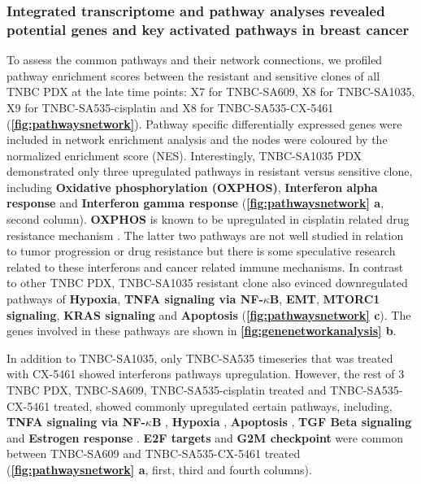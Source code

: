 \subsubsection{Integrated transcriptome and pathway analyses revealed potential genes and key activated pathways in breast cancer}
To assess the common pathways and their network connections, 
we profiled pathway enrichment scores between the resistant and sensitive clones of all TNBC PDX at the late time points:  X7 for TNBC-SA609, X8 for TNBC-SA1035, X9 for TNBC-SA535-cisplatin and X8 for TNBC-SA535-CX-5461 (\textbf{\autoref{fig:pathwaysnetwork}}). 
Pathway specific differentially expressed genes were included in network enrichment analysis and the nodes were coloured by the normalized enrichment score (NES). Interestingly, TNBC-SA1035 PDX demonstrated only three upregulated pathways in resistant versus sensitive clone, including \textbf{Oxidative phosphorylation (OXPHOS)}, \textbf{Interferon alpha response} \cite{provance2019deciphering} and \textbf{Interferon gamma response} \cite{mojic2018dark} (\textbf{\autoref{fig:pathwaysnetwork} a}, second column). \textbf{\ac{OXPHOS}} is known to be upregulated in cisplatin related drug resistance mechanism \cite{lee2017myc}. The latter two pathways are not well studied in relation to tumor progression or drug resistance but there is some speculative research related to these interferons and cancer related immune mechanisms. In contrast to other TNBC PDX, TNBC-SA1035 resistant clone also evinced downregulated pathways of \textbf{Hypoxia}, \textbf{TNFA signaling via NF-$\kappa$B}, \textbf{\ac{EMT}}, \textbf{MTORC1 signaling}, \textbf{KRAS signaling} and \textbf{Apoptosis} ({\textbf{\autoref{fig:pathwaysnetwork} c}}). The genes involved in these pathways are shown in \textbf{\autoref{fig:genenetworkanalysis} b}.

In addition to TNBC-SA1035, only TNBC-SA535 timeseries that was treated with CX-5461 showed interferons pathways upregulation. However, the rest of 3 TNBC PDX, TNBC-SA609, TNBC-SA535-cisplatin treated and TNBC-SA535-CX-5461 treated, showed commonly upregulated certain pathways, including, \textbf{TNFA signaling via NF-$\kappa$B} \cite{lagunas2008nuclear,ito2015down, ryan2019targeting}, \textbf{Hypoxia} \cite{lee2012hypoxia, mcevoy2015identifying, deben2018hypoxia,li2019erk}, \textbf{Apoptosis} \cite{panaretakis2012cisplatin}, \textbf{TGF Beta signaling} \cite{zhang2019tgfbeta1} and \textbf{Estrogen response} \cite{zhu2018er}. \textbf{E2F targets} \cite{zheng2020upregulation} and \textbf{G2M checkpoint} \cite{visconti2016cell} were common between TNBC-SA609 and TNBC-SA535-CX-5461 treated (\textbf{\autoref{fig:pathwaysnetwork} a}, first, third and fourth columns). 



